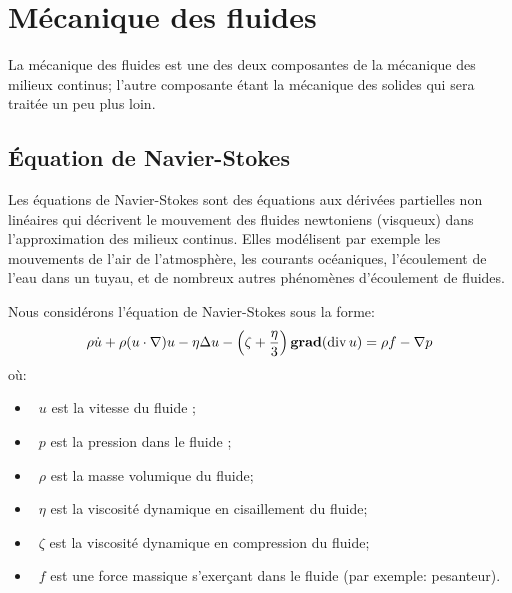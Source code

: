 \medskip
\section{Mécanique des fluides}
La mécanique des fluides est une des deux composantes de la mécanique des milieux continus; l'autre composante étant la mécanique des solides qui sera traitée un peu plus loin.





\medskip
\subsection{Équation de Navier-Stokes}\label{Sec-NavierStokes}
Les équations de Navier-Stokes sont des équations aux dérivées partielles non linéaires qui décrivent le mouvement des fluides newtoniens (visqueux) dans l'approximation des milieux continus. Elles modélisent par exemple les mouvements de l'air de l'atmosphère, les courants océaniques, l'écoulement de l'eau dans un tuyau, et de nombreux autres phénomènes d'écoulement de fluides.

\medskip
Nous considérons l'équation de Navier-Stokes sous la forme:
\begin{equation}
\rho \dot{u} + \rho (u\cdot\nabla)u - \eta \Delta u
- \left( \zeta + \frac{\eta}{3} \right) \operatorname{\mathbf{grad}} (\operatorname{div} u)
= \rho f - \nabla p
\end{equation}
où:
\begin{itemize}
  \item~$u$ est la vitesse du fluide ;
  \item~$p$ est la pression dans le fluide ;
  \item~$\rho$ est la masse volumique du fluide;
  \item~$\eta$ est la viscosité dynamique en cisaillement du fluide;
  \item~$\zeta$ est la viscosité dynamique en compression du fluide;
  \item~$f$ est une force massique s'exerçant dans le fluide (par exemple: pesanteur).
\end{itemize}

